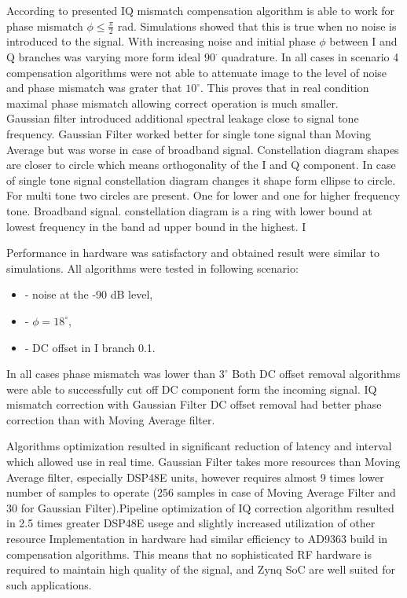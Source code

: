 \documentclass[en,printmode]{mgr}
\begin{document}
	According to \cite{iqcorr} presented IQ mismatch compensation algorithm is able to work for
	phase mismatch $\phi \le \frac{\pi}{2}$ rad. Simulations showed that this is true when no noise
	is introduced to the signal.
	With increasing noise and initial phase $\phi$ between I and Q branches was varying more form ideal
	$90^\cdot$ quadrature. In all cases in scenario 4 compensation algorithms were not able to 
	attenuate image to the level of noise and phase mismatch was grater that $10^{\circ}$. This proves
	that in real condition maximal phase mismatch allowing correct operation is much smaller.
	\\
	
	Gaussian filter introduced additional spectral
	leakage close to signal tone frequency. Gaussian Filter worked better for single tone signal
	than Moving Average but was worse in case of broadband signal.
	Constellation diagram shapes are closer to circle which means orthogonality of the I and Q
	 component.
	In case of single tone signal constellation diagram changes it shape form ellipse to circle. For
	multi tone two circles are present. One for lower and one for higher frequency tone. Broadband
	signal.
	constellation diagram is a ring with lower bound at lowest frequency in the band ad upper bound in
	the highest. I
	
	Performance in hardware was satisfactory and obtained result were similar to simulations.
	All algorithms were tested in following scenario:
	\begin{itemize}
		\item - noise at the -90 dB level,
		\item - $\phi=18^\circ$,
		\item - DC offset in I branch 0.1.
	\end{itemize}	
	In all cases phase mismatch was lower than $3^\circ$	
	Both DC offset removal algorithms were able to successfully cut off DC component form the incoming
	signal. IQ mismatch correction with Gaussian Filter DC offset removal had better phase correction
	than with Moving Average filter.
	
	Algorithms optimization resulted in significant reduction of latency and interval which
	allowed use in real time. Gaussian Filter takes more resources than Moving Average filter,
	especially DSP48E units, however requires almost 9 times lower number of samples to operate (256 samples in case of 
	Moving Average Filter and 30 for Gaussian Filter).Pipeline optimization of IQ correction algorithm resulted
	in 2.5 times greater DSP48E usege and slightly increased utilization of other resource
	Implementation in hardware had similar efficiency to AD9363 build in compensation algorithms.
	This means that no sophisticated RF hardware is required to maintain high quality of the signal,
	and Zynq SoC are well suited for such applications.
	\\
\end{document}
